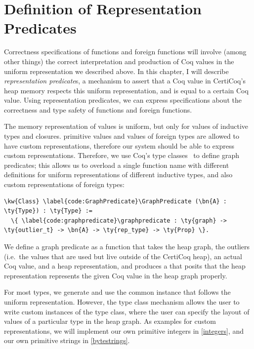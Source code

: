 \section{Definition of Representation Predicates}
\label{predicatedefns}

Correctness specifications of \constructor{} \glue{} functions and \gls{foreign function}s will involve (among other things) the correct interpretation and production of Coq values in the uniform representation we described above.
In this chapter, I will describe \emph{representation predicate}s, a mechanism to assert that a Coq value in CertiCoq's heap memory respects this uniform representation, and is equal to a certain Coq value. Using representation predicates, we can express specifications about the correctness and type safety of \glue{} functions and \gls{foreign function}s.


The memory representation of values is uniform, but only for values of \gls{inductive type}s and \gls{closure}s. \Gls{primitive} values and values of \gls{foreign type}s are allowed to have custom representations, therefore our system should be able to express custom representations. Therefore, we use Coq's type classes~\cite{sozeau2008first} to define graph predicates; this allows us to overload a single function name with different definitions for uniform representations of different \gls{inductive type}s, and also custom representations of \gls{foreign type}s:

\newcommand{\GraphPredicate}{\hyperref[code:GraphPredicate]{\ty{GraphPredicate}}}
\newcommand{\graphpredicate}{\hyperref[code:graphpredicate]{\fn{graph\_\linebreak[0]predicate}}}
\begin{Verbatim}
\kw{Class} \label{code:GraphPredicate}\GraphPredicate (\bn{A} : \ty{Type}) : \ty{Type} :=
  \{ \label{code:graphpredicate}\graphpredicate : \ty{graph} -> \ty{outlier_t} -> \bn{A} -> \ty{rep_type} -> \ty{Prop} \}.
\end{Verbatim}


We define a graph predicate as a function that takes the heap graph, the outliers (i.e.\ the values that are used but live outside of the \gls{CertiCoq heap}), an actual Coq value, and a heap representation, and produces a  that posits that the heap representation represents the given Coq value in the heap graph properly.

For most types, we generate and use the common instance that follows the uniform representation. However, the type class mechanism allows the user to write custom instances of the \GraphPredicate{} type class, where the user can specify the layout of values of a particular type in the heap graph. As examples for custom representations, we will implement our own \gls{primitive} integers in \autoref{integers}, and our own \gls{primitive} strings in \autoref{bytestrings}.

